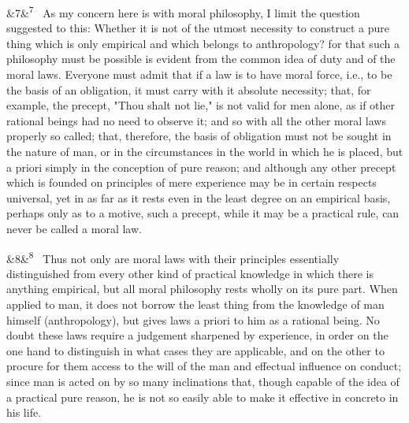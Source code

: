 \documentclass[12pt]{article}
\newcommand{\para}[1][]{\par\noindent\ifx&#1&\else\textsuperscript{\footnotesize #1}~\fi}
\begin{document}
\para[7] As my concern here is with moral philosophy, I limit the question suggested to this: Whether it is not of the utmost necessity to construct a pure thing which is only empirical and which belongs to anthropology? for that such a philosophy must be possible is evident from the common idea of duty and of the moral laws. Everyone must admit that if a law is to have moral force, i.e., to be the basis of an obligation, it must carry with it absolute necessity; that, for example, the precept, "Thou shalt not lie," is not valid for men alone, as if other rational beings had no need to observe it; and so with all the other moral laws properly so called; that, therefore, the basis of obligation must not be sought in the nature of man, or in the circumstances in the world in which he is placed, but a priori simply in the conception of pure reason; and although any other precept which is founded on principles of mere experience may be in certain respects universal, yet in as far as it rests even in the least degree on an empirical basis, perhaps only as to a motive, such a precept, while it may be a practical rule, can never be called a moral law.

\para[8] Thus not only are moral laws with their principles essentially distinguished from every other kind of practical knowledge in which there is anything empirical, but all moral philosophy rests wholly on its pure part. When applied to man, it does not borrow the least thing from the knowledge of man himself (anthropology), but gives laws a priori to him as a rational being. No doubt these laws require a judgement sharpened by experience, in order on the one hand to distinguish in what cases they are applicable, and on the other to procure for them access to the will of the man and effectual influence on conduct; since man is acted on by so many inclinations that, though capable of the idea of a practical pure reason, he is not so easily able to make it effective in concreto in his life.
\end{document}
